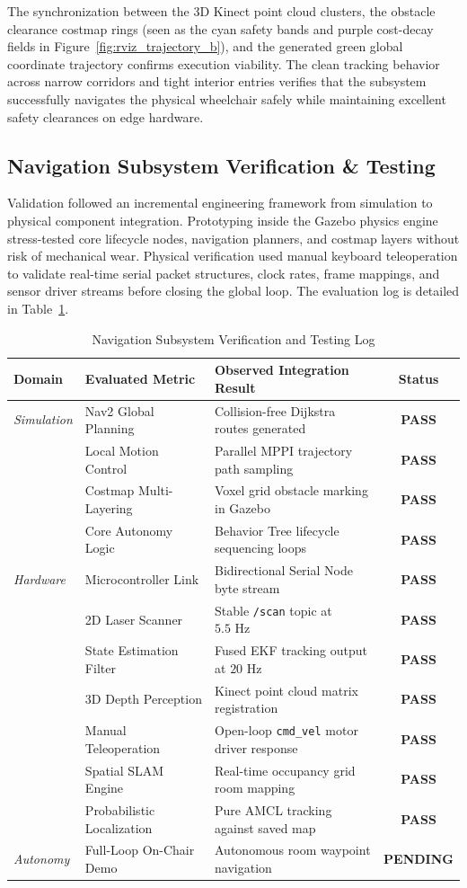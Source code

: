 \documentclass[12pt,a4paper]{report}
\begin{document}
The synchronization between the 3D Kinect point cloud clusters, the obstacle clearance costmap rings (seen as the cyan safety bands and purple cost-decay fields in Figure~\ref{fig:rviz_trajectory_b}), and the generated green global coordinate trajectory confirms execution viability. The clean tracking behavior across narrow corridors and tight interior entries verifies that the subsystem successfully navigates the physical wheelchair safely while maintaining excellent safety clearances on edge hardware.
\subsection{Navigation Subsystem Verification \& Testing}
Validation followed an incremental engineering framework from simulation to physical component integration. Prototyping inside the Gazebo physics engine stress-tested core lifecycle nodes, navigation planners, and costmap layers without risk of mechanical wear. Physical verification used manual keyboard teleoperation to validate real-time serial packet structures, clock rates, frame mappings, and sensor driver streams before closing the global loop. The evaluation log is detailed in Table~\ref{tab:nav_tests}.

\begin{table}[htbp]
\centering
\caption{Navigation Subsystem Verification and Testing Log}
\label{tab:nav_tests}
\small
\begin{tabular}{lllc}
\hline
\textbf{Domain} & \textbf{Evaluated Metric} & \textbf{Observed Integration Result} & \textbf{Status} \\ \hline
\textit{Simulation} & Nav2 Global Planning & Collision-free Dijkstra routes generated & \textbf{PASS} \\
& Local Motion Control & Parallel MPPI trajectory path sampling & \textbf{PASS} \\
& Costmap Multi-Layering & Voxel grid obstacle marking in Gazebo & \textbf{PASS} \\
& Core Autonomy Logic & Behavior Tree lifecycle sequencing loops & \textbf{PASS} \\ \hline
\textit{Hardware} & Microcontroller Link & Bidirectional Serial Node byte stream & \textbf{PASS} \\
& 2D Laser Scanner & Stable \texttt{/scan} topic at $5.5\text{ Hz}$ & \textbf{PASS} \\
& State Estimation Filter & Fused EKF tracking output at $20\text{ Hz}$ & \textbf{PASS} \\
& 3D Depth Perception & Kinect point cloud matrix registration & \textbf{PASS} \\
& Manual Teleoperation & Open-loop \texttt{cmd\_vel} motor driver response & \textbf{PASS} \\
& Spatial SLAM Engine & Real-time occupancy grid room mapping & \textbf{PASS} \\
& Probabilistic Localization & Pure AMCL tracking against saved map & \textbf{PASS} \\ \hline
\textit{Autonomy} & Full-Loop On-Chair Demo & Autonomous room waypoint navigation & \textbf{PENDING} \\ \hline
\end{tabular}
\end{table}
\end{document}
